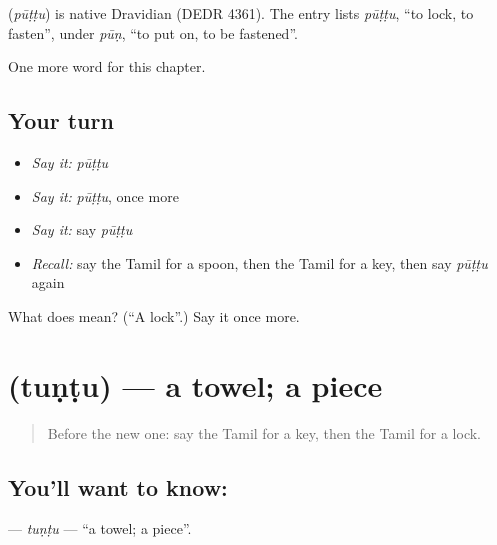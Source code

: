 \begin{cousinweb}
\textbf{} (\emph{pūṭṭu}) is native Dravidian (DEDR 4361). The entry lists \emph{pūṭṭu}, \textquotedblleft{}to lock, to fasten\textquotedblright{}, under \emph{pūṇ}, \textquotedblleft{}to put on, to be fastened\textquotedblright{}.
\end{cousinweb}

\begin{grammarlens}[title={What you've built}]
One more word for this chapter.
\end{grammarlens}

\subsection*{Your turn}
\begin{itemize}
\raggedright
  \item \emph{Say it:} \emph{pūṭṭu}
  \item \emph{Say it:} \emph{pūṭṭu}, once more
  \item \emph{Say it:} say \emph{pūṭṭu}
  \item \emph{Recall:} say the Tamil for a spoon, then the Tamil for a key, then say \emph{pūṭṭu} again
\end{itemize}

\begin{tcolorbox}[breakable,colback=teal!4,colframe=teal!35!black,title={Before you move on}]
What does  mean? (\textquotedblleft{}A lock\textquotedblright{}.) Say it once more.
\end{tcolorbox}
\section[\texorpdfstring{\ta{துண்டு} (tuṇṭu)}{துண்டு (tuṇṭu)}]{ (tuṇṭu) — a towel; a piece}

\label{lesson:TA-C119-tuntu}



\begin{quote}
Before the new one: say the Tamil for a key, then the Tamil for a lock.
\end{quote}

\subsection*{You'll want to know: }
\textbf{} — \emph{tuṇṭu} — \textquotedblleft{}a towel; a piece\textquotedblright{}.

